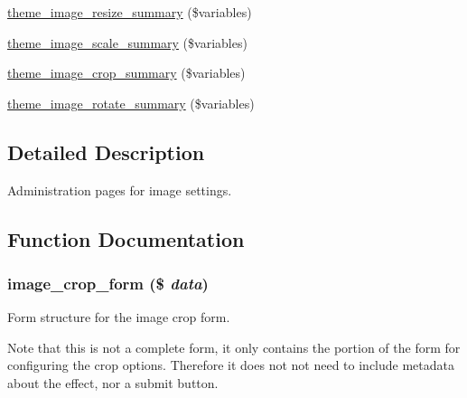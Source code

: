 \begin{DoxyCompactItemize}
\item 
\hyperlink{group__themeable_ga19f204a2137d1fdd8fe4183a047f94ef}{theme\_\-image\_\-resize\_\-summary} (\$variables)
\item 
\hyperlink{group__themeable_gaed6cfce9b86de8f5c500bf9228134cf5}{theme\_\-image\_\-scale\_\-summary} (\$variables)
\item 
\hyperlink{group__themeable_ga499049d5bb381dd2315dffd36f9a9c43}{theme\_\-image\_\-crop\_\-summary} (\$variables)
\item 
\hyperlink{group__themeable_gae47fb79da2660519fd8f650af8486a59}{theme\_\-image\_\-rotate\_\-summary} (\$variables)
\end{DoxyCompactItemize}


\subsection{Detailed Description}
Administration pages for image settings. 

\subsection{Function Documentation}
\hypertarget{image_8admin_8inc_a9d54a4b791373a6f383894146a8e8d73}{
\subsubsection[{image\_\-crop\_\-form}]{\setlength{\rightskip}{0pt plus 5cm}image\_\-crop\_\-form (\$ {\em data})}}
\label{image_8admin_8inc_a9d54a4b791373a6f383894146a8e8d73}
Form structure for the image crop form.

Note that this is not a complete form, it only contains the portion of the form for configuring the crop options. Therefore it does not not need to include metadata about the effect, nor a submit button.



